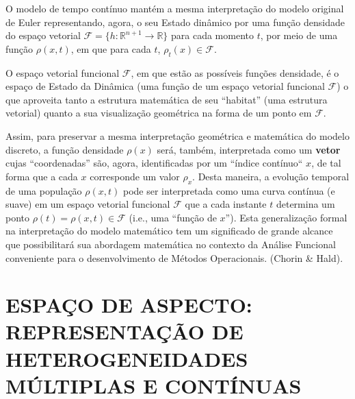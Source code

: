 {\begin{enumerate}
O modelo de tempo contínuo mantém a mesma interpretação do modelo original de Euler representando, agora, o seu Estado dinâmico por uma função densidade do espaço vetorial \(\mathcal{F} = \{h: \mathbb{R}^{n+1} \to \mathbb{R}\}\) para cada momento \(t\), por meio de uma função \(\rho(x,t)\), em que para cada \(t\), \(\rho_t(x) \in \mathcal{F}\).

O espaço vetorial funcional \(\mathcal{F}\), em que estão as possíveis funções densidade, é o espaço de Estado da Dinâmica (uma função de um espaço vetorial funcional \(\mathcal{F}\)) o que aproveita tanto a estrutura matemática de seu ``habitat'' (uma estrutura vetorial) quanto a sua visualização geométrica na forma de um ponto em \(\mathcal{F}\).

Assim, para preservar a mesma interpretação geométrica e matemática do modelo discreto, a função densidade \(\rho(x)\) será, também, interpretada como um \textbf{vetor} cujas ``coordenadas'' são, agora, identificadas por um ``índice contínuo`` \(x\), de tal forma que a cada \(x\) corresponde um valor \(\rho_x\). Desta maneira, a evolução temporal de uma população \(\rho(x,t)\) pode ser interpretada como uma curva contínua (e suave) em um espaço vetorial funcional \(\mathcal{F}\) que a cada instante \(t\) determina um ponto \(\rho(t) = \rho(x, t) \in \mathcal{F}\) (i.e., uma ``função de \(x\)''). Esta generalização formal na interpretação do modelo matemático tem um significado de grande alcance que possibilitará sua abordagem matemática no contexto da Análise Funcional conveniente para o desenvolvimento de Métodos Operacionais. (Chorin \& Hald).
\end{enumerate}
}


\section{ESPAÇO DE ASPECTO: REPRESENTAÇÃO DE HETEROGENEIDADES MÚLTIPLAS E CONTÍNUAS}

